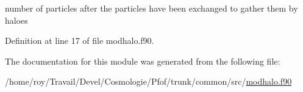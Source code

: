 number of particles after the particles have been exchanged to gather them by haloes 



Definition at line 17 of file modhalo.\-f90.



The documentation for this module was generated from the following file\-:\begin{DoxyCompactItemize}
\item 
/home/roy/\-Travail/\-Devel/\-Cosmologie/\-Pfof/trunk/common/src/\hyperlink{modhalo_8f90}{modhalo.\-f90}\end{DoxyCompactItemize}

